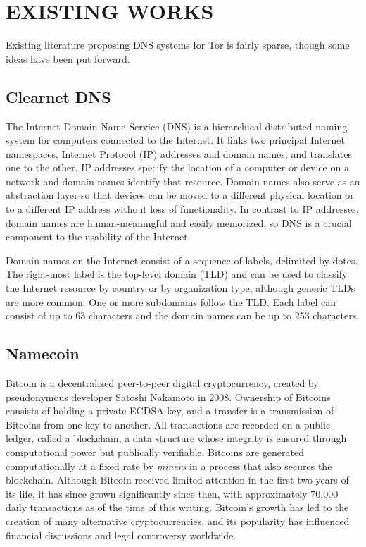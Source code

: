 

\chapter{\uppercase{Existing Works}}

Existing literature proposing DNS systems for Tor is fairly sparse, though some ideas have been put forward.

\section{Clearnet DNS}

The Internet Domain Name Service (DNS) is a hierarchical distributed naming system for computers connected to the Internet. It links two principal Internet namespaces, Internet Protocol (IP) addresses and domain names, and translates one to the other. IP addresses specify the location of a computer or device on a network and domain names identify that resource. Domain names also serve as an abstraction layer so that devices can be moved to a different physical location or to a different IP address without loss of functionality. In contrast to IP addresses, domain names are human-meaningful and easily memorized, so DNS is a crucial component to the usability of the Internet.

Domain names on the Internet consist of a sequence of labels, delimited by dotes. The right-most label is the top-level domain (TLD) and can be used to classify the Internet resource by country or by organization type, although generic TLDs are more common. One or more subdomains follow the TLD. Each label can consist of up to 63 characters and the domain names can be up to 253 characters.



\section{Namecoin}


Bitcoin is a decentralized peer-to-peer digital cryptocurrency, created by pseudonymous developer Satoshi Nakamoto in 2008. Ownership of Bitcoins consists of holding a private ECDSA key, and a transfer is a transmission of Bitcoins from one key to another. All transactions are recorded on a public ledger, called a blockchain, a data structure whose integrity is ensured through computational power but publically verifiable. Bitcoins are generated computationally at a fixed rate by \textit{miners} in a process that also secures the blockchain. Although Bitcoin received limited attention in the first two years of its life, it has since grown significantly since then, with approximately 70,000 daily transactions as of the time of this writing. Bitcoin's growth has led to the creation of many alternative cryptocurrencies, and its popularity has influenced financial discussions and legal controversy worldwide.

